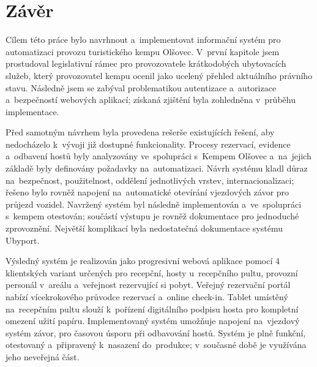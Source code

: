 \chapter{Závěr}
Cílem této práce bylo navrhnout a~implementovat informační systém pro automatizaci provozu turistického kempu Olšovec.
V~první kapitole jsem prostudoval legislativní rámec pro provozovatele krátkodobých ubytovacích služeb, který provozovatel kempu ocenil jako ucelený přehled aktuálního právního stavu.
Následně jsem se zabýval problematikou autentizace a~autorizace a~bezpečností webových aplikací; získaná zjištění byla zohledněna v~průběhu implementace.

Před samotným návrhem byla provedena rešerše existujících řešení, aby nedocházelo k~vývoji již dostupné funkcionality.
Procesy rezervací, evidence a~odbavení hostů byly analyzovány ve~spolupráci s~Kempem Olšovec a~na~jejich základě byly definovány požadavky na~automatizaci.
Návrh systému kladl důraz na~bezpečnost, použitelnost, oddělení jednotlivých vrstev, internacionalizaci; řešeno bylo rovněž napojení na~automatické otevírání vjezdových závor pro průjezd vozidel.
Navržený systém byl následně implementován a~ve~spolupráci s~kempem otestován; součástí výstupu je rovněž dokumentace pro jednoduché zprovoznění.
Největší komplikací byla nedostatečná dokumentace systému Ubyport.

Výsledný systém je realizován jako progresivní webová aplikace pomocí 4 klientských variant určených pro recepční, hosty u~recepčního pultu, provozní personál v~areálu a~veřejnost rezervující si pobyt.
Veřejný rezervační portál nabízí vícekrokového průvodce rezervací a~online check-in.
Tablet umístěný na~recepčním pultu slouží k~pořízení digitálního podpisu hosta pro kompletní omezení užití papíru.
Implementovaný systém umožňuje napojení na~vjezdový systém závor, pro časovou úsporu při odbavování hostů.
Systém je plně funkční, otestovaný a~připravený k~nasazení do~produkce; v~současné době je využívána jeho neveřejná část.
